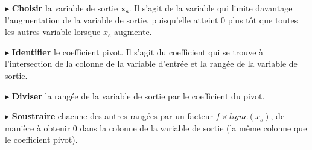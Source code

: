 \documentclass{report}
\begin{document}
    \noindent
    $\blacktriangleright$ 
    \textbf{Choisir} la variable de sortie 
    $\boldsymbol{x_s}$. Il s'agit de la variable 
    qui limite davantage l'augmentation de la variable de sortie, 
    puisqu'elle atteint 0 plus tôt que toutes les autres variable 
    lorsque $x_e$ augmente. 

    \noindent
    $\blacktriangleright$ 
    \textbf{Identifier} le coefficient pivot. Il s'agit du 
    coefficient qui se trouve à l'intersection de la colonne de 
    la variable d'entrée et la rangée de la variable de sortie. 


    \noindent
    $\blacktriangleright$ 
    \textbf{Diviser} la rangée de la variable de sortie par 
    le coefficient du pivot.


    \noindent
    $\blacktriangleright$ 
    \textbf{Soustraire} chacune des autres rangées par un facteur 
    $f \times ligne(x_s)$, de manière à obtenir 0 dans la colonne 
    de la variable de sortie (la même colonne que le coefficient pivot). 
\end{document}

